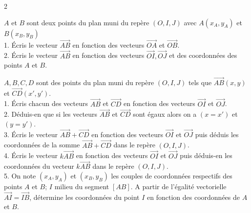 \begin{multicols*}{2}
  	
  	$A$ et $B$ sont deux points du plan muni du repère $(O, I, J)$ avec $A(x_A, y_A)$ et $B(x_B, y_B)$ \\
  	1. Écris le vecteur $\overrightarrow{AB}$ en fonction des vecteurs $\overrightarrow{OA}$ et $\overrightarrow{OB}$. \\
  	2. Écris le vecteur $\overrightarrow{AB}$ en fonction des vecteurs $\overrightarrow{OI}, \overrightarrow{OJ}$ et des coordonnées des points $A$ et $B$.
  	
  	$A, B, C, D$ sont des points du plan muni du repère $(O, I, J)$ tels que $\overrightarrow{AB}(x, y)$ et $\overrightarrow{CD}(x', y')$. \\
  	1. Écris chacun des vecteurs $\overrightarrow{AB}$ et $\overrightarrow{CD}$ en fonction des vecteurs $\overrightarrow{OI}$ et $\overrightarrow{OJ}$. \\
  	2. Déduis-en que si les vecteurs $\overrightarrow{AB}$ et $\overrightarrow{CD}$ sont égaux alors on a $(x = x')$ et $(y = y')$. \\
  	3. Écris le vecteur $\overrightarrow{AB} + \overrightarrow{CD}$ en fonction des vecteurs $\overrightarrow{OI}$ et $\overrightarrow{OJ}$ puis déduis les coordonnées de la somme $\overrightarrow{AB} + \overrightarrow{CD}$ dans le repère $(O, I, J)$. \\
  	4. Écris le vecteur $k\overrightarrow{AB}$ en fonction des vecteurs $\overrightarrow{OI}$ et $\overrightarrow{OJ}$ puis déduis-en les coordonnées du vecteur $k\overrightarrow{AB}$ dans le repère $(O, I, J)$. \\
  	5. On note $(x_A, y_A)$ et $(x_B, y_B)$ les couples de coordonnées respectifs des points $A$ et $B$; $I$ milieu du segment $[AB]$. A partir de l'égalité vectorielle $\overrightarrow{AI} = \overrightarrow{IB}$, détermine les coordonnées du point $I$ en fonction des coordonnées de $A$ et $B$.\\
  	 
  	

\end{multicols*}
